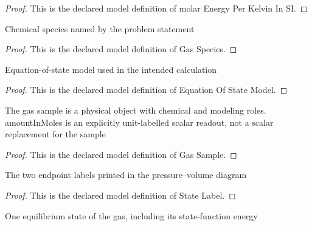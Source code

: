 \begin{proof}
  This is the declared model definition of molar Energy Per Kelvin In SI.
\end{proof}
\begin{definition}
  \label{def:physics:phyx-mini-0413:phyxminiproblems-problemphyxmini0413-gasspecies}
  Chemical species named by the problem statement
\end{definition}
\begin{proof}
  This is the declared model definition of Gas Species.
\end{proof}
\begin{definition}
  \label{def:physics:phyx-mini-0413:phyxminiproblems-problemphyxmini0413-equationofstatemodel}
  Equation-of-state model used in the intended calculation
\end{definition}
\begin{proof}
  This is the declared model definition of Equation Of State Model.
\end{proof}
\begin{definition}
  \label{def:physics:phyx-mini-0413:phyxminiproblems-problemphyxmini0413-gassample}
  The gas sample is a physical object with chemical and modeling roles. amountInMoles is an explicitly unit-labelled scalar readout, not a scalar replacement for the sample
\end{definition}
\begin{proof}
  This is the declared model definition of Gas Sample.
\end{proof}
\begin{definition}
  \label{def:physics:phyx-mini-0413:phyxminiproblems-problemphyxmini0413-statelabel}
  The two endpoint labels printed in the pressure--volume diagram
\end{definition}
\begin{proof}
  This is the declared model definition of State Label.
\end{proof}
\begin{definition}
  \label{def:physics:phyx-mini-0413:phyxminiproblems-problemphyxmini0413-thermodynamicstate}
  One equilibrium state of the gas, including its state-function energy
\end{definition}
